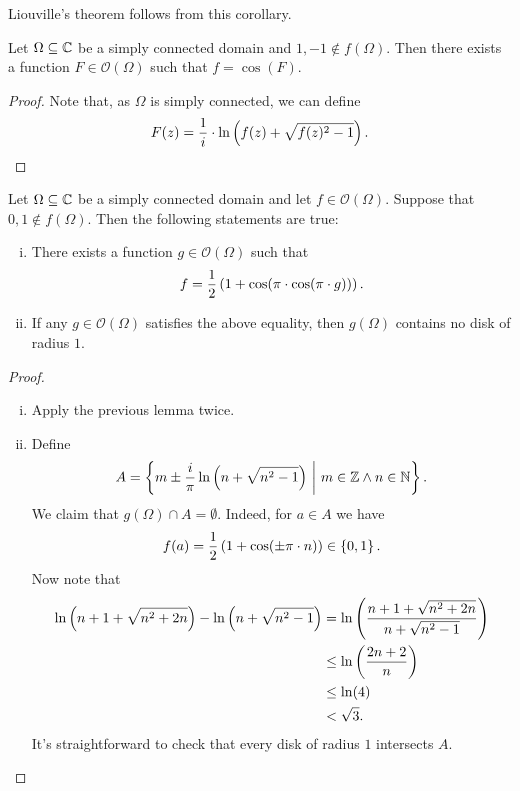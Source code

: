 \begin{opomba}
Liouville's theorem follows from this corollary.
\end{opomba}

\begin{lema}\label{thm_hol:lm:arcos}
Let $\Omega \subseteq \mathbb{C}$ be a simply connected domain and
$1, -1 \not \in f(\Omega)$. Then there exists a function
$F \in \mathcal{O}(\Omega)$ such that $f = \cos(F)$.
\end{lema}

\begin{proof}
Note that, as $\Omega$ is simply connected, we can define
\[
F(z) =
\frac{1}{i} \cdot \ln \left(f(z) + \sqrt{f(z)^2-1}\right). \qedhere
\]
\end{proof}

\begin{izrek}
Let $\Omega \subseteq \mathbb{C}$ be a simply connected domain and let
$f \in \mathcal{O}(\Omega)$. Suppose that
$0, 1 \not \in f(\Omega)$. Then the following statements are true:

\begin{enumerate}[i)]
\item There exists a function $g \in \mathcal{O}(\Omega)$ such that
\[
f = \frac{1}{2} \left(1 + \cos(\pi \cdot \cos(\pi \cdot g))\right).
\]
\item If any $g \in \mathcal{O}(\Omega)$ satisfies the above
equality, then $g(\Omega)$ contains no disk of radius $1$.
\end{enumerate}
\end{izrek}

\begin{proof}
\phantom{a}
\begin{enumerate}[i)]
\item Apply the previous lemma twice.
\item Define
\[
A =
\left\{m \pm \frac{i}{\pi} \ln \left(n + \sqrt{n^2-1}\right)~\middle\vert~m \in \mathbb{Z} \land n \in \mathbb{N}\right\}.
\]
We claim that $g(\Omega) \cap A = \emptyset$. Indeed, for $a \in A$
we have
\[
f(a) = \frac{1}{2} \left(1 + \cos(\pm \pi \cdot n)\right) \in \left\{0,1\right\}.
\]
Now note that
\begin{align*}
\ln \left(n+1 + \sqrt{n^2 + 2n}\right) - \ln \left(n + \sqrt{n^2-1}\right) &=
\ln \left(\frac{n+1 + \sqrt{n^2 + 2n}}{n + \sqrt{n^2 - 1}}\right)
\\
&\leq
\ln \left(\frac{2n + 2}{n}\right)
\\
&\leq \ln(4)
\\
&<
\sqrt{3}.
\end{align*}
It's straightforward to check that every disk of radius $1$
intersects $A$. \qedhere
\end{enumerate}
\end{proof}

